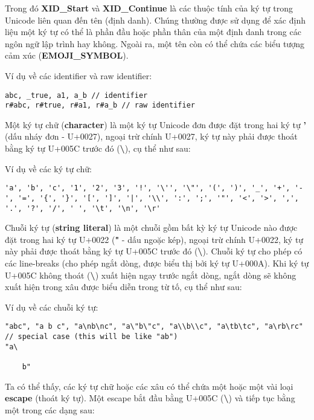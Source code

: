     \regexidentifier

\noindent Trong đó \textbf{XID\_Start} và \textbf{XID\_Continue} là các thuộc tính của ký tự trong Unicode liên quan đến tên (định danh). Chúng thường được sử dụng để xác định liệu một ký tự có thể là phần đầu hoặc phần thân của một định danh trong các ngôn ngữ lập trình hay không. Ngoài ra, một tên còn có thể chứa các biểu tượng cảm xúc (\textbf{EMOJI\_SYMBOL}).

\noindent Ví dụ về các identifier và raw identifier:
\begin{lstlisting}[]
abc, _true, a1, a_b // identifier
r#abc, r#true, r#a1, r#a_b // raw identifier
\end{lstlisting}

    Một ký tự chữ (\textbf{character}) là một ký tự Unicode đơn được đặt trong hai ký tự \textbf{'} (dấu nháy đơn - U+0027), ngoại trừ chính U+0027, ký tự này phải được thoát bằng ký tự U+005C trước đó (\textbf{\textbackslash}), cụ thể như sau:

    \regexcharliteral

\noindent Ví dụ về các ký tự chữ:
\begin{lstlisting}[]
'a', 'b', 'c', '1', '2', '3', '!', '\'', '\"', '(', ')', '_', '+', '-', '=', '{', '}', '[', ']', '|', '\\', ':', ';', '"', '<', '>', ',', '.', '?', '/', ' ', '\t', '\n', '\r'
\end{lstlisting}

    Chuỗi ký tự (\textbf{string literal}) là một chuỗi gồm bất kỳ ký tự Unicode nào được đặt trong hai ký tự U+0022 (\textbf{"} - dấu ngoặc kép), ngoại trừ chính U+0022, ký tự này phải được thoát bằng ký tự U+005C trước đó (\textbf{\textbackslash}). Chuỗi ký tự cho phép có các line-breaks (cho phép ngắt dòng, được biểu thị bởi ký tự U+000A). Khi ký tự U+005C không thoát (\textbf{\textbackslash}) xuất hiện ngay trước ngắt dòng, ngắt dòng sẽ không xuất hiện trong xâu được biểu diễn trong từ tố, cụ thể như sau:

    \regexstringliteral

\noindent Ví dụ về các chuỗi ký tự:
\begin{lstlisting}[]
"abc", "a b c", "a\nb\nc", "a\"b\"c", "a\\b\\c", "a\tb\tc", "a\rb\rc"
// special case (this will be like "ab")
"a\

    b"
\end{lstlisting}

    Ta có thể thấy, các ký tự chữ hoặc các xâu có thể chứa một hoặc một vài loại \textbf{escape} (thoát ký tự). Một escape bắt đầu bằng U+005C (\textbf{\textbackslash}) và tiếp tục bằng một trong các dạng sau:


